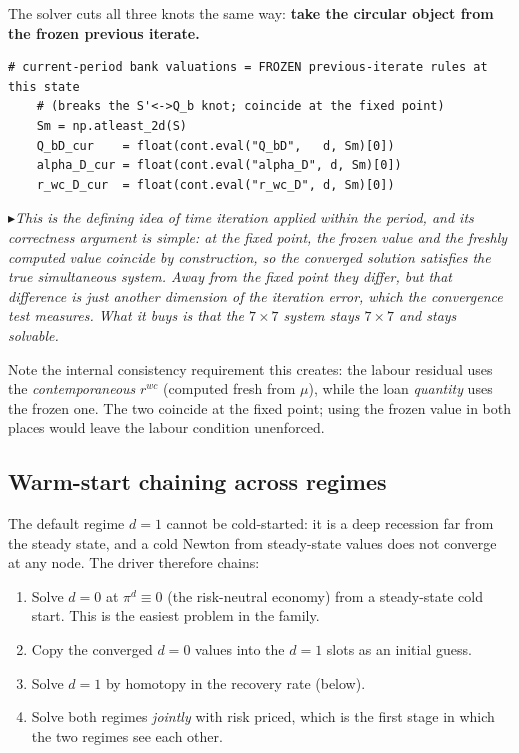 \documentclass[11pt]{article}
\numberwithin{equation}{section}
\newcommand{\code}[1]{\texttt{\small #1}}
\theoremstyle{definition}
\theoremstyle{plain}
\theoremstyle{remark}
\newcommand{\trick}[1]{\par\smallskip\noindent
  \textcolor{notec}{$\blacktriangleright$}\;\emph{#1}\par\smallskip}
\begin{document}
The solver cuts all three knots the same way: \textbf{take the circular object from
the frozen previous iterate.}

\begin{lstlisting}[caption={Knot-breaking with frozen valuations. \code{point\_map.py}.}]
    # current-period bank valuations = FROZEN previous-iterate rules at this state
    # (breaks the S'<->Q_b knot; coincide at the fixed point)
    Sm = np.atleast_2d(S)
    Q_bD_cur    = float(cont.eval("Q_bD",   d, Sm)[0])
    alpha_D_cur = float(cont.eval("alpha_D", d, Sm)[0])
    r_wc_D_cur  = float(cont.eval("r_wc_D", d, Sm)[0])
\end{lstlisting}

\trick{This is the defining idea of time iteration applied \emph{within} the period,
and its correctness argument is simple: at the fixed point, the frozen value and the
freshly computed value coincide by construction, so the converged solution satisfies
the true simultaneous system. Away from the fixed point they differ, but that
difference is just another dimension of the iteration error, which the convergence
test measures. What it buys is that the $7\times7$ system stays $7\times7$ and stays
solvable.}

Note the internal consistency requirement this creates: the labour residual uses the
\emph{contemporaneous} $r^{wc}$ (computed fresh from $\mu$), while the loan
\emph{quantity} uses the frozen one. The two coincide at the fixed point; using the
frozen value in both places would leave the labour condition unenforced.

\subsection{Warm-start chaining across regimes}

The default regime $d=1$ cannot be cold-started: it is a deep recession far from the
steady state, and a cold Newton from steady-state values does not converge at any
node. The driver therefore chains:

\begin{enumerate}
\item Solve $d=0$ at $\pi^{d}\equiv0$ (the risk-neutral economy) from a steady-state
      cold start. This is the easiest problem in the family.
\item Copy the converged $d=0$ values into the $d=1$ slots as an initial guess.
\item Solve $d=1$ by homotopy in the recovery rate (below).
\item Solve both regimes \emph{jointly} with risk priced, which is the first stage in
      which the two regimes see each other.
\end{enumerate}
\end{document}

